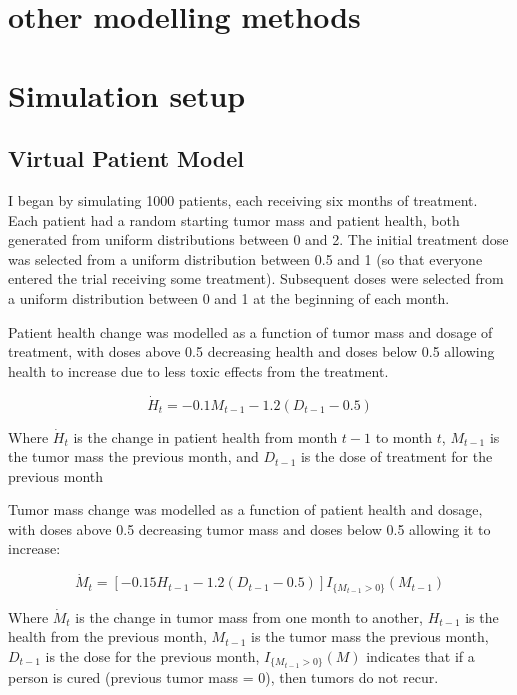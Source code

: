 \documentclass[12pt]{article}
\begin{document}

\section{other modelling methods} %
\label{sec:other_modelling_methods}


\section{Simulation setup}

\subsection{Virtual Patient Model} %
\label{sub:vpm}

I began by simulating 1000 patients, each receiving six months of treatment. Each patient had a random starting tumor mass and patient health, both generated from uniform distributions between 0 and 2. The initial treatment dose was selected from a uniform distribution between 0.5 and 1 (so that everyone entered the trial receiving some treatment). Subsequent doses were selected from a uniform distribution between 0 and 1 at the beginning of each month.

Patient health change was modelled as a function of tumor mass and dosage of treatment, with doses above 0.5 decreasing health and doses below 0.5 allowing health to increase due to less toxic effects from the treatment.

\[
\dot{H}_{t} = - 0.1 M_{t-1} - 1.2 (D_{t-1} - 0.5)
\]

Where $\dot{H}_{t}$ is the change in patient health from month $t-1$ to month $t$, 
$M_{t-1}$ is the tumor mass the previous month, and 
$D_{t-1}$ is the dose of treatment for the previous month

Tumor mass change was modelled as a function of patient health and dosage, with doses above 0.5 decreasing tumor mass and doses below 0.5 allowing it to increase:

\[
\dot{M}_{t} = [- 0.15 H_{t-1} - 1.2 (D_{t-1} - 0.5)] I_{\{M_{t-1} > 0\}}(M_{t-1})
\]

Where $\dot{M}_{t}$ is the change in tumor mass from one month to another,
$H_{t-1}$ is the health from the previous month,
$M_{t-1}$ is the tumor mass the previous month,
$D_{t-1}$ is the dose for the previous month,
$I_{\{M_{t-1} > 0\}}(M)$ indicates that if a person is cured (previous tumor mass = 0), then tumors do not recur.
\end{document}
